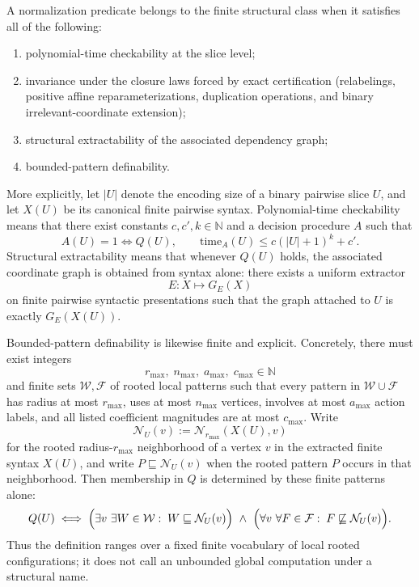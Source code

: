 \begin{definition}\label{def:admissible-normalization}
A normalization predicate belongs to the finite structural class when it satisfies all of the following:
\begin{enumerate}
\item polynomial-time checkability at the slice level;
\item invariance under the closure laws forced by exact certification (relabelings, positive affine reparameterizations, duplication operations, and binary irrelevant-coordinate extension);
\item structural extractability of the associated dependency graph;
\item bounded-pattern definability.
\end{enumerate}
\end{definition}

More explicitly, let $|U|$ denote the encoding size of a binary pairwise slice $U$, and let $X(U)$ be its canonical finite pairwise syntax. Polynomial-time checkability means that there exist constants $c,c',k \in \mathbb{N}$ and a decision procedure $A$ such that
\[
A(U)=1 \iff Q(U),
\qquad
\mathrm{time}_A(U) \le c(|U|+1)^k + c'.
\]
Structural extractability means that whenever $Q(U)$ holds, the associated coordinate graph is obtained from syntax alone: there exists a uniform extractor
\[
E : X \mapsto G_E(X)
\]
on finite pairwise syntactic presentations such that the graph attached to $U$ is exactly $G_E(X(U))$.

Bounded-pattern definability is likewise finite and explicit. Concretely, there must exist integers
\[
r_{\max},\; n_{\max},\; a_{\max},\; c_{\max} \in \mathbb{N}
\]
and finite sets $\mathcal W,\mathcal F$ of rooted local patterns such that every pattern in $\mathcal W \cup \mathcal F$ has radius at most $r_{\max}$, uses at most $n_{\max}$ vertices, involves at most $a_{\max}$ action labels, and all listed coefficient magnitudes are at most $c_{\max}$. Write
\[
\mathcal N_U(v) := \mathcal N_{r_{\max}}(X(U),v)
\]
for the rooted radius-$r_{\max}$ neighborhood of a vertex $v$ in the extracted finite syntax $X(U)$, and write $P \sqsubseteq \mathcal N_U(v)$ when the rooted pattern $P$ occurs in that neighborhood. Then membership in $Q$ is determined by these finite patterns alone:
\[
Q(U) \iff \Bigl(\exists v\ \exists W\in\mathcal W:\; W \sqsubseteq \mathcal N_U(v)\Bigr)
\ \land\
\Bigl(\forall v\ \forall F\in\mathcal F:\; F \not\sqsubseteq \mathcal N_U(v)\Bigr).
\]
Thus the definition ranges over a fixed finite vocabulary of local rooted configurations; it does not call an unbounded global computation under a structural name.

